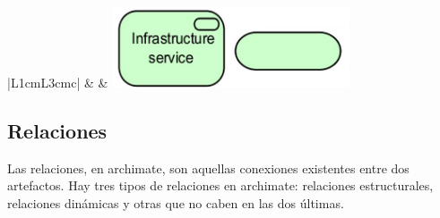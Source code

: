 \begin{table}
\begin{center}
{\begin{tabular}{|L{1cm}L{3cm}c|}
	\hline
	 & 
     &  
    \includegraphics[width=7cm]{./imagenes/Archimate/technologyservice.png}\\
	\hline
  \end{tabular}
  }
    \end{center}
\end{table}

\subsection{Relaciones}

Las relaciones, en archimate, son aquellas conexiones existentes entre dos artefactos. Hay tres tipos de relaciones en archimate: relaciones estructurales, relaciones dinámicas y otras que no caben en las dos últimas.


